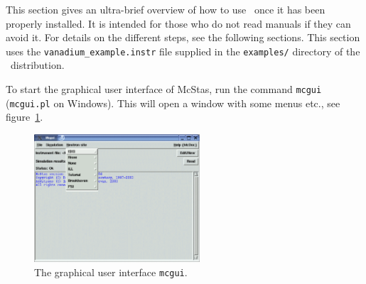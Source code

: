 This section gives an ultra-brief overview of how to use \MCS\ once it
has been properly installed. It is intended for those who do not read
manuals if they can avoid it. For details on the different steps, see
the following sections. This section uses the
\verb+vanadium_example.instr+ file supplied in the \verb+examples/+
directory of the \MCS\ distribution. %

To start the graphical user interface of McStas, run the command
\verb+mcgui+ (\verb+mcgui.pl+ on Windows). This will open a window with some menus etc.,
see figure~\ref{fig:mcgui}. 
\begin{figure}[htb!]
  \begin{center}
    \includegraphics[width=0.55\textwidth]{figures/mcgui.eps}
  \end{center}
\caption{The graphical user interface \texttt{mcgui}.}
\label{fig:mcgui}
\end{figure}

